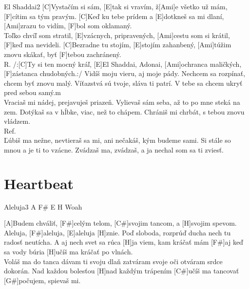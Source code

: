 \documentclass[12pt]{article}
\begin{document}
\begin{song}{El Shaddai}{2}
	[C]Vystačím si sám, [E]tak si vravím,
	ž[Ami]e všetko už mám, [F]cítim sa tým pravým.
	[C]Keď ku tebe prídem a [E]dotkneš sa mi dlaní,
	[Ami]zrazu to vidím, [F]bol som oklamaný.
	\\
	[C]Toľko chvíľ som stratil, 
	[E]vzácnych, pripravených,
	[Ami]cestu som si krátil, [F]keď ma nevideli.
	[C]Bezradne tu stojím, [E]stojím zahanbený,
	[Ami]túžim znovu skákať, byť [F]tebou zachránený.
	\\
	R. /:[C]Ty si ten mocný kráľ,
	[E]El Shaddai, Adonai,
	[Ami]ochranca maličkých,
	[F]zástanca chudobných.:/
	\columnbreak
	Vidíš moju vieru, aj moje pády.
	Nechcem sa rozpínať, 
	chcem byť znovu malý.
	Víťazstvá sú tvoje, sláva ti patrí.
	V tebe sa chcem ukryť pred sebou samý.m
	\\
	Vraciaš mi nádej, prejavuješ priazeň.
	Vylievaš sám seba, 
	až to po mne steká na zem.
	Dotýkaš sa v hĺbke, viac, než to chápem.
	Chrániš mi chrbát, s tebou znovu vládzem.
	\\
	Ref.
	\\
	Ľúbiš ma nežne, nevtieraš sa mi,
	ani nečakáš, kým budeme sami.
	Si stále so mnou a je ti to vzácne.
	Zvádzaš ma, zvádzaš,
	a ja nechal som sa ti zviesť.
\end{song}

\newpage

\section{Heartbeat}

\begin{song}{Aleluja}{3}
	A F\# E H Woah
	
	[A]Budem chváliť, 
	[F#]celým telom,
	[C#]svojim tancom,
	a [H]svojim spevom.
	\\
	[A]Aleluja, [F#]aleluja, 
	[E]aleluja [H]znie.
	Poď sloboda, rozprúď ducha
	nech tu radosť neutícha.
	\columnbreak
	[F#]A aj nech svet sa rúca
	[H]ja viem, kam kráčať mám
	[F#]aj keď sa vody búria
	[H]učíš ma kráčať po vlnách.
	\\
	Voláš ma do tanca
	dávam ti svoju dlaň
	zatváram svoje oči
	otváram srdce dokorán.
	\columnbreak
	[A]Nad každou bolesťou
	[H]nad každým trápením
	[C#]učíš ma tancovať
	[G#]počujem, spievaš mi.
\end{song}
\end{document}
